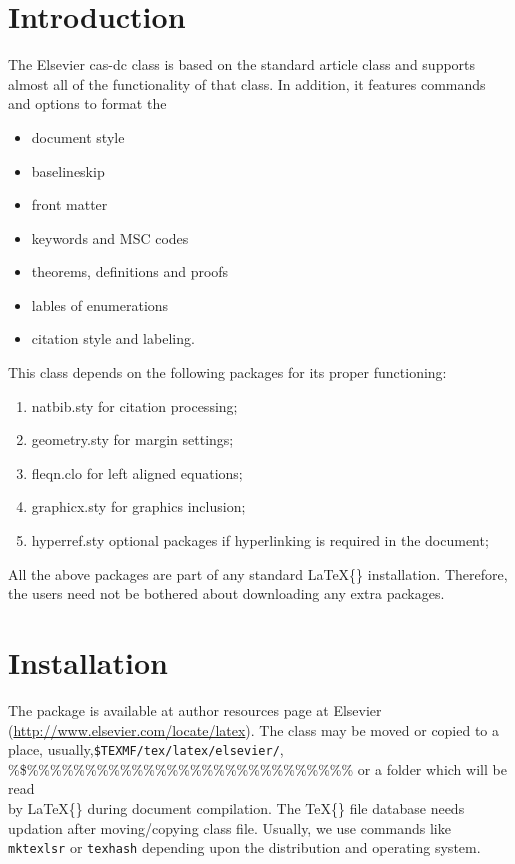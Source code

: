 \documentclass[]{elsarticle} %
\begin{document}
\maketitle

\section{Introduction}

The Elsevier cas-dc class is based on the standard article class and
supports almost all of the functionality of that class. In addition, it
features commands and options to format the

\begin{itemize} \item document style \item baselineskip \item front
matter \item keywords and MSC codes \item theorems, definitions and
proofs \item lables of enumerations \item citation style and labeling.
\end{itemize}

This class depends on the following packages for its proper functioning:

\begin{enumerate}
\itemsep=0pt
\item {natbib.sty} for citation processing;
\item {geometry.sty} for margin settings;
\item {fleqn.clo} for left aligned equations;
\item {graphicx.sty} for graphics inclusion;
\item {hyperref.sty} optional packages if hyperlinking is
  required in the document;
\end{enumerate}

All the above packages are part of any standard \LaTeX\{\} installation.
Therefore, the users need not be bothered about downloading any extra
packages.

\section{Installation}

The package is available at author resources page at Elsevier
(\url{http://www.elsevier.com/locate/latex}). The class may be moved or
copied to a place, usually,\linebreak \verb+$TEXMF/tex/latex/elsevier/+,
\%\$\%\%\%\%\%\%\%\%\%\%\%\%\%\%\%\%\%\%\%\%\%\%\%\%\%\%\%\% or a folder
which will be read\\
by \LaTeX\{\} during document compilation. The \TeX\{\} file database
needs updation after moving/copying class file. Usually, we use commands
like \verb+mktexlsr+ or \verb+texhash+ depending upon the distribution
and operating system.
\end{document}
